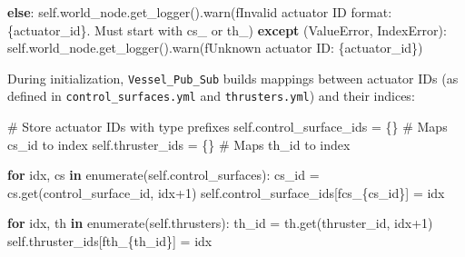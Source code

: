 \documentclass[
  letterpaper,
  DIV=11,
  numbers=noendperiod]{scrreprt}
\newenvironment{Shaded}{\begin{snugshade}}{\end{snugshade}}
\newcommand{\BuiltInTok}[1]{\textcolor[rgb]{0.00,0.23,0.31}{#1}}
\newcommand{\CommentTok}[1]{\textcolor[rgb]{0.37,0.37,0.37}{#1}}
\newcommand{\ControlFlowTok}[1]{\textcolor[rgb]{0.00,0.23,0.31}{\textbf{#1}}}
\newcommand{\DecValTok}[1]{\textcolor[rgb]{0.68,0.00,0.00}{#1}}
\newcommand{\KeywordTok}[1]{\textcolor[rgb]{0.00,0.23,0.31}{\textbf{#1}}}
\newcommand{\NormalTok}[1]{\textcolor[rgb]{0.00,0.23,0.31}{#1}}
\newcommand{\OperatorTok}[1]{\textcolor[rgb]{0.37,0.37,0.37}{#1}}
\newcommand{\PreprocessorTok}[1]{\textcolor[rgb]{0.68,0.00,0.00}{#1}}
\newcommand{\SpecialCharTok}[1]{\textcolor[rgb]{0.37,0.37,0.37}{#1}}
\newcommand{\SpecialStringTok}[1]{\textcolor[rgb]{0.13,0.47,0.30}{#1}}
\newcommand{\StringTok}[1]{\textcolor[rgb]{0.13,0.47,0.30}{#1}}
\newcommand{\VariableTok}[1]{\textcolor[rgb]{0.07,0.07,0.07}{#1}}
\begin{document}
\begin{Shaded}
\begin{Highlighting}[]
            \ControlFlowTok{else}\NormalTok{:}
                \VariableTok{self}\NormalTok{.world\_node.get\_logger().warn(}\SpecialStringTok{f\textquotesingle{}Invalid actuator ID format: }\SpecialCharTok{\{}\NormalTok{actuator\_id}\SpecialCharTok{\}}\SpecialStringTok{. Must start with cs\_ or th\_\textquotesingle{}}\NormalTok{)}
        \ControlFlowTok{except}\NormalTok{ (}\PreprocessorTok{ValueError}\NormalTok{, }\PreprocessorTok{IndexError}\NormalTok{):}
            \VariableTok{self}\NormalTok{.world\_node.get\_logger().warn(}\SpecialStringTok{f\textquotesingle{}Unknown actuator ID: }\SpecialCharTok{\{}\NormalTok{actuator\_id}\SpecialCharTok{\}}\SpecialStringTok{\textquotesingle{}}\NormalTok{)}
\end{Highlighting}
\end{Shaded}

During initialization, \texttt{Vessel\_Pub\_Sub} builds mappings between
actuator IDs (as defined in \texttt{control\_surfaces.yml} and
\texttt{thrusters.yml}) and their indices:

\begin{Shaded}
\begin{Highlighting}[]
\CommentTok{\# Store actuator IDs with type prefixes}
\VariableTok{self}\NormalTok{.control\_surface\_ids }\OperatorTok{=}\NormalTok{ \{\}  }\CommentTok{\# Maps \textquotesingle{}cs\_id\textquotesingle{} to index}
\VariableTok{self}\NormalTok{.thruster\_ids }\OperatorTok{=}\NormalTok{ \{\}        }\CommentTok{\# Maps \textquotesingle{}th\_id\textquotesingle{} to index}
    
\ControlFlowTok{for}\NormalTok{ idx, cs }\KeywordTok{in} \BuiltInTok{enumerate}\NormalTok{(}\VariableTok{self}\NormalTok{.control\_surfaces):}
\NormalTok{    cs\_id }\OperatorTok{=}\NormalTok{ cs.get(}\StringTok{\textquotesingle{}control\_surface\_id\textquotesingle{}}\NormalTok{, idx}\OperatorTok{+}\DecValTok{1}\NormalTok{)}
    \VariableTok{self}\NormalTok{.control\_surface\_ids[}\SpecialStringTok{f\textquotesingle{}cs\_}\SpecialCharTok{\{}\NormalTok{cs\_id}\SpecialCharTok{\}}\SpecialStringTok{\textquotesingle{}}\NormalTok{] }\OperatorTok{=}\NormalTok{ idx}

\ControlFlowTok{for}\NormalTok{ idx, th }\KeywordTok{in} \BuiltInTok{enumerate}\NormalTok{(}\VariableTok{self}\NormalTok{.thrusters):}
\NormalTok{    th\_id }\OperatorTok{=}\NormalTok{ th.get(}\StringTok{\textquotesingle{}thruster\_id\textquotesingle{}}\NormalTok{, idx}\OperatorTok{+}\DecValTok{1}\NormalTok{)}
    \VariableTok{self}\NormalTok{.thruster\_ids[}\SpecialStringTok{f\textquotesingle{}th\_}\SpecialCharTok{\{}\NormalTok{th\_id}\SpecialCharTok{\}}\SpecialStringTok{\textquotesingle{}}\NormalTok{] }\OperatorTok{=}\NormalTok{ idx}
\end{Highlighting}
\end{Shaded}
\end{document}
